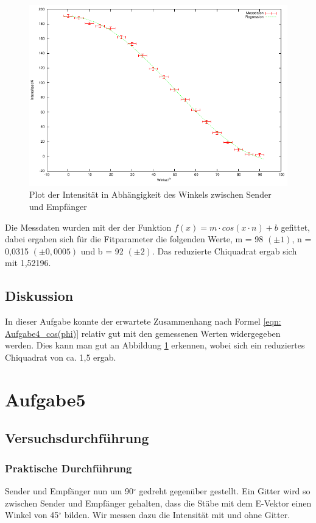 \documentclass[12pt]{scrartcl}
\begin{document}
\begin{figure}[H]
\centering
    \includegraphics[scale = 1]{a_4.pdf}
  	\caption[Plot der Intensität in Abhängigkeit des Winkels zwischen Sender und Empfänger]{Plot der Intensität in Abhängigkeit des Winkels zwischen Sender und Empfänger}
  \label{fig:a_4}
\end{figure}

Die Messdaten wurden mit der der Funktion $ f(x) = m \cdot cos(x \cdot n) + b$ gefittet, dabei ergaben sich für die Fitparameter die folgenden Werte, m = 98 $(\pm 1)$, n = 0,0315 $(\pm 0,0005)$ und b = 92 $(\pm 2)$. Das reduzierte Chiquadrat ergab sich mit 1,52196.
\subsection{Diskussion}
In dieser Aufgabe konnte der erwartete Zusammenhang nach Formel \ref{eqn: Aufgabe4_cos(phi)} relativ gut mit den gemessenen Werten widergegeben werden.
Dies kann man gut an Abbildung \ref{fig:a_4} erkennen, wobei sich ein reduziertes Chiquadrat von ca. 1,5 ergab.
\section{Aufgabe5}
\subsection{Versuchsdurchführung}
\subsubsection{Praktische Durchführung}
Sender und Empfänger nun um 90$^{\circ}$ gedreht gegenüber gestellt. Ein Gitter wird so zwischen Sender und Empfänger gehalten, dass die Stäbe mit dem E-Vektor einen Winkel von 45$^{\circ}$ bilden. Wir messen dazu die Intensität mit und ohne Gitter.
\end{document}
